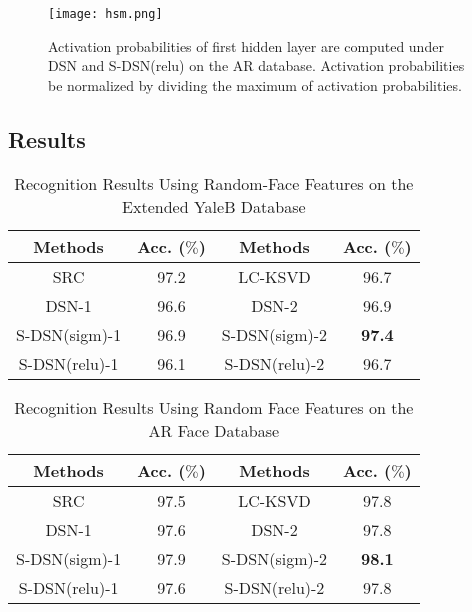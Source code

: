 \documentclass[letterpaper]{article}
\begin{document}
\begin{figure}[ht]
\vskip -0.1in
\centering
\centerline{\texttt{[image: hsm.png]}}
\vskip -0.1in
\small{
\caption{Activation probabilities of first hidden layer are computed under DSN and S-DSN(relu) on the AR database. Activation probabilities be normalized by dividing the maximum of activation probabilities.}}
\label{fig:hsmar}
\vskip -0.15in
\end{figure}

\subsection{Results}
\label{sec:result}


\begin{table}[t]
\small{\caption{Recognition Results Using Random-Face Features on the Extended YaleB Database}}
\label{tab:resultExtYaleB}
\begin{center}
\small{
\begin{tabular}{c|c|c|c}
\hline
Methods      &    Acc. ($\%$) &  Methods       &  Acc. ($\%$)  \\
\hline
SRC          &   97.2             &  LC-KSVD       &   96.7     \\
DSN-1        &   96.6             &  DSN-2         &   96.9     \\
\hline
S-DSN(sigm)-1     &  96.9              & S-DSN(sigm)-2       &  \textbf{97.4}   \\
S-DSN(relu)-1     &  96.1              & S-DSN(relu)-2       &  96.7    \\
\hline
\end{tabular}}
\end{center}
\vskip -0.25in
\end{table}

\begin{table}[t]
\small{\caption{Recognition Results Using Random Face Features on the AR Face Database}}
\label{tab:resultAR}
\begin{center}
\small{
\begin{tabular}{c|c|c|c}
\hline
Methods   &Acc. ($\%$) &  Methods      &  Acc. ($\%$)     \\
\hline
SRC       &   97.5         & LC-KSVD       &   97.8       \\
DSN-1    &   97.6         & DSN-2        &   97.8       \\
\hline
S-DSN(sigm)-1  &  97.9          & S-DSN(sigm)-2      &  \textbf{98.1}  \\
S-DSN(relu)-1  &  97.6          & S-DSN(relu)-2      &  97.8           \\
\hline
\end{tabular}}
\end{center}
\vskip -0.25in
\end{table}
\end{document}
